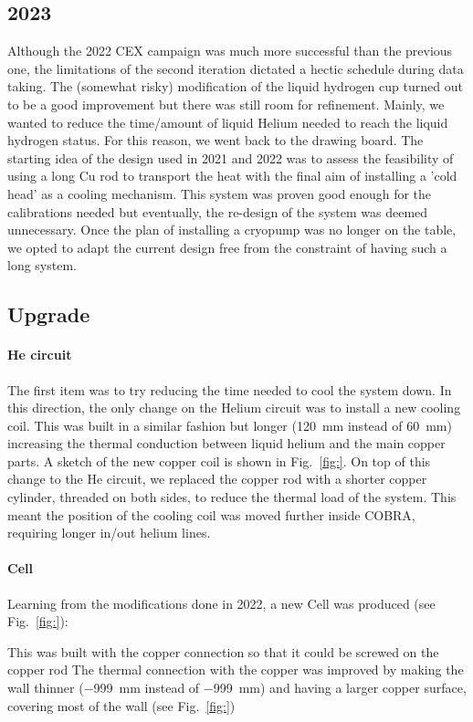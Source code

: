 \begin{refsection}
\section{2023}
    Although the 2022 CEX campaign was much more successful than the previous one, the limitations of the second iteration dictated a hectic schedule during data taking. 
    The (somewhat risky) modification of the liquid hydrogen cup turned out to be a good improvement but there was still room for refinement. 
    Mainly, we wanted to reduce the time/amount of liquid Helium needed to reach the liquid hydrogen status. 
    For this reason, we went back to the drawing board.
    The starting idea of the design used in 2021 and 2022 was to assess the feasibility of using a long Cu rod to transport the heat with the final aim of installing a 'cold head' as a cooling mechanism.
    This system was proven good enough for the calibrations needed but eventually, the re-design of the system was deemed unnecessary.
    Once the plan of installing a cryopump was no longer on the table, we opted to adapt the current design free from the constraint of having such a long system. 

    \subsection{Upgrade}
        \paragraph{He circuit}
        The first item was to try reducing the time needed to cool the system down.
        In this direction, the only change on the Helium circuit was to install a new cooling coil.
        This was built in a similar fashion but longer (\SI{120}{mm} instead of \SI{60}{mm}) increasing the thermal conduction between liquid helium and the main copper parts.
        A sketch of the new copper coil is shown in Fig.~\ref{fig:}.
        On top of this change to the He circuit, we replaced the copper rod with a shorter copper cylinder, threaded on both sides, to reduce the thermal load of the system.
        This meant the position of the cooling coil was moved further inside COBRA, requiring longer in/out helium lines. 
        
        \paragraph{Cell} Learning from the modifications done in 2022, a new Cell was produced (see Fig.~\ref{fig:}):
        \begin{outline}
            \1 This was built with the copper connection so that it could be screwed on the copper rod
            \1 The thermal connection with the copper was improved by making the wall thinner (\SI{-999}{mm} instead of \SI{-999}{mm}) and having a larger copper surface, covering most of the wall (see Fig.~\ref{fig:})
        \end{outline}
        

\end{refsection}
